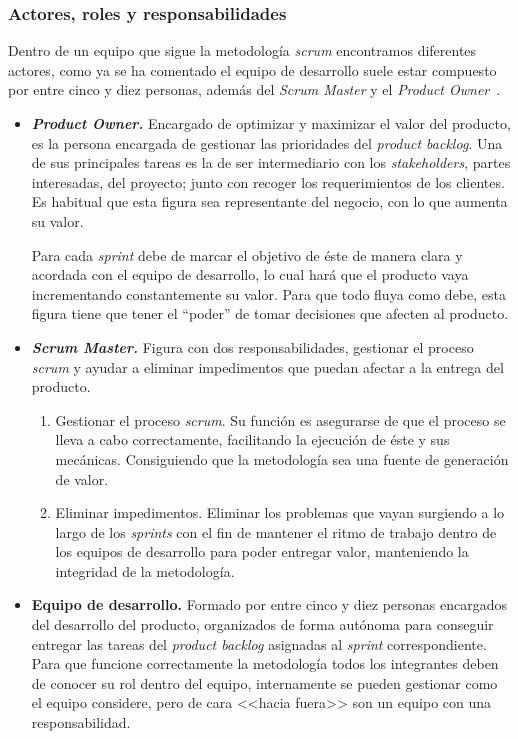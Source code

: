\subsubsection{Actores, roles y responsabilidades}
Dentro de un equipo que sigue la metodología \textit{scrum} encontramos diferentes actores, como ya se ha comentado el equipo de desarrollo suele estar compuesto por entre cinco y diez personas, además del \textit{Scrum Master} y el \textit{Product Owner}~\cite{julioroche_2020}.
\begin{itemize}
\item \textbf{\textit{Product Owner.}} Encargado de optimizar y maximizar el valor del producto, es la persona encargada de gestionar las prioridades del \textit{product backlog}. Una de sus principales tareas es la de ser intermediario con los \textit{stakeholders}, partes interesadas, del proyecto; junto con recoger los requerimientos de los clientes. Es habitual que esta figura sea representante del negocio, con lo que aumenta su valor.

Para cada \textit{sprint} debe de marcar el objetivo de éste de manera clara y acordada con el equipo de desarrollo, lo cual hará que el producto vaya incrementando constantemente su valor. Para que todo fluya como debe, esta figura tiene que tener el ``poder'' de tomar decisiones que afecten al producto.

\item \textbf{\textit{Scrum Master.}} Figura con dos responsabilidades, gestionar el proceso \textit{scrum} y ayudar a eliminar impedimentos que puedan afectar a la entrega del producto.
\begin{enumerate}
\item Gestionar el proceso \textit{scrum}. Su función es asegurarse de que el proceso se lleva a cabo correctamente, facilitando la ejecución de éste y sus mecánicas. Consiguiendo que la metodología sea una fuente de generación de valor.
\item Eliminar impedimentos. Eliminar los problemas que vayan surgiendo a lo largo de los \textit{sprints} con el fin de mantener el ritmo de trabajo dentro de los equipos de desarrollo para poder entregar valor, manteniendo la integridad de la metodología.
\end{enumerate}
\item \textbf{Equipo de desarrollo.} Formado por entre cinco y diez personas encargados del desarrollo del producto, organizados de forma autónoma para conseguir entregar las tareas del \textit{product backlog} asignadas al \textit{sprint} correspondiente. Para que funcione correctamente la metodología todos los integrantes deben de conocer su rol dentro del equipo, internamente se pueden gestionar como el equipo considere, pero de cara <<hacia fuera>> son un equipo con una responsabilidad.
\end{itemize}

